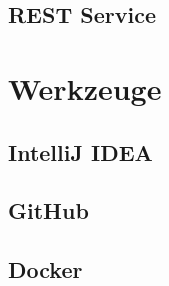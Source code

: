 \subsection{REST Service}

\section{Werkzeuge}
\subsection{IntelliJ IDEA}

\subsection{GitHub}

\subsection{Docker}
